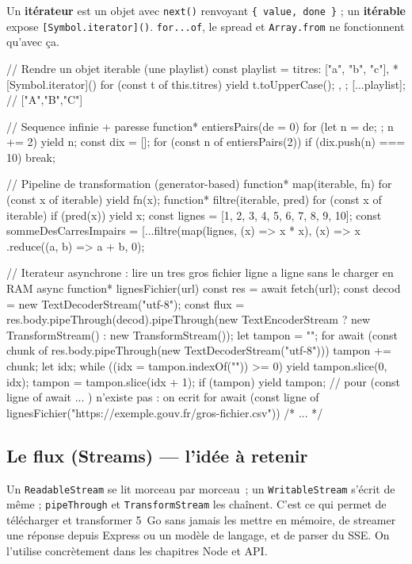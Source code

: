 Un \textbf{it\'erateur} est un objet avec \verb|next()| renvoyant \verb|{ value, done }| ;
un \textbf{it\'erable} expose \verb|[Symbol.iterator]()|. \verb|for...of|, le spread et
\verb|Array.from| ne fonctionnent qu'avec \c{c}a.

\begin{codejs}
// Rendre un objet iterable (une playlist)
const playlist = {
  titres: ["a", "b", "c"],
  *[Symbol.iterator]() { for (const t of this.titres) yield t.toUpperCase(); },
};
[...playlist];                    // ["A","B","C"]

// Sequence infinie + paresse
function* entiersPairs(de = 0) { for (let n = de; ; n += 2) yield n; }
const dix = [];
for (const n of entiersPairs(2)) { if (dix.push(n) === 10) break; }

// Pipeline de transformation (generator-based)
function* map(iterable, fn) { for (const x of iterable) yield fn(x); }
function* filtre(iterable, pred) { for (const x of iterable) if (pred(x)) yield x; }
const lignes = [1, 2, 3, 4, 5, 6, 7, 8, 9, 10];
const sommeDesCarresImpairs = [...filtre(map(lignes, (x) => x * x), (x) => x %
  .reduce((a, b) => a + b, 0);

// Iterateur asynchrone : lire un tres gros fichier ligne a ligne sans le charger en RAM
async function* lignesFichier(url) {
  const res = await fetch(url);
  const decod = new TextDecoderStream("utf-8");
  const flux = res.body.pipeThrough(decod).pipeThrough(new TextEncoderStream ? new TransformStream() : new TransformStream());
  let tampon = "";
  for await (const chunk of res.body.pipeThrough(new TextDecoderStream("utf-8"))) {
    tampon += chunk;
    let idx;
    while ((idx = tampon.indexOf("\n")) >= 0) { yield tampon.slice(0, idx); tampon = tampon.slice(idx + 1); }
  }
  if (tampon) yield tampon;
}
// pour (const ligne of await ... ) n'existe pas : on ecrit
for await (const ligne of lignesFichier("https://exemple.gouv.fr/gros-fichier.csv")) { /* ... */ }
\end{codejs}

\subsection{Le flux (Streams) --- l'id\'ee \`a retenir}

Un \verb|ReadableStream| se lit morceau par morceau~; un \verb|WritableStream| s'\'ecrit de m\^eme ;
\verb|pipeThrough| et \verb|TransformStream| les cha\^inent. C'est ce qui permet de
t\'el\'echarger et transformer 5~Go sans jamais les mettre en m\'emoire, de streamer une r\'eponse
depuis Express ou un mod\`ele de langage, et de parser du SSE. On l'utilise concr\`etement dans
les chapitres Node et API.


